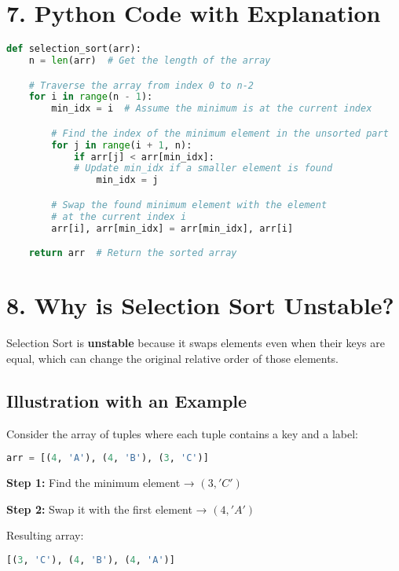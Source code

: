 \documentclass[14pt]{extarticle}
\begin{document}
\section*{7. Python Code with Explanation}

\begin{lstlisting}[language=Python]
def selection_sort(arr):
    n = len(arr)  # Get the length of the array

    # Traverse the array from index 0 to n-2
    for i in range(n - 1):
        min_idx = i  # Assume the minimum is at the current index

        # Find the index of the minimum element in the unsorted part
        for j in range(i + 1, n):
            if arr[j] < arr[min_idx]:
	        # Update min_idx if a smaller element is found
                min_idx = j  

        # Swap the found minimum element with the element
        # at the current index i
        arr[i], arr[min_idx] = arr[min_idx], arr[i]

    return arr  # Return the sorted array
\end{lstlisting}

\newpage
\section*{8. Why is Selection Sort Unstable?}

Selection Sort is \textbf{unstable} because it swaps elements even when their keys are equal, which can change the original relative order of those elements.

\subsection*{Illustration with an Example}

Consider the array of tuples where each tuple contains a key and a label:

\begin{lstlisting}[language=Python]
arr = [(4, 'A'), (4, 'B'), (3, 'C')]
\end{lstlisting}

\textbf{Step 1:} Find the minimum element → $(3, 'C')$

\textbf{Step 2:} Swap it with the first element → $(4, 'A')$

Resulting array:

\begin{lstlisting}[language=Python]
[(3, 'C'), (4, 'B'), (4, 'A')]
\end{lstlisting}
\end{document}
